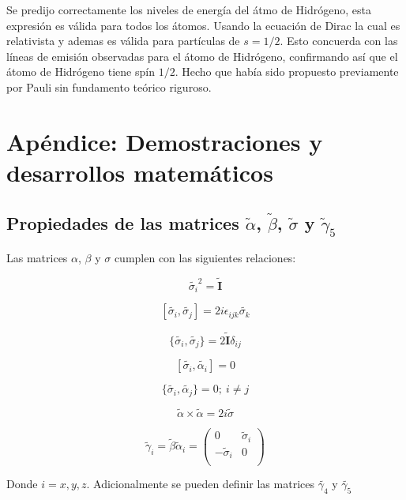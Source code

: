 \documentclass[a4paper, 12pt]{article} %
\begin{document}
Se predijo correctamente los niveles de energ\'ia del \'atmo de Hidr\'ogeno,
esta expresi\'on es v\'alida para todos los \'atomos. Usando la ecuaci\'on 
de Dirac la cual es relativista y ademas es v\'alida para part\'iculas 
de $s=1/2$. Esto concuerda con las l\'ineas de emisi\'on observadas para 
el \'atomo de Hidr\'ogeno, confirmando as\'i  que el \'atomo de Hidr\'ogeno 
tiene sp\'in $1/2$. Hecho que hab\'ia sido propuesto previamente por Pauli
sin fundamento te\'orico riguroso.




\section{Ap\'endice: Demostraciones y desarrollos matem\'aticos}\label{sec:apendice}

\subsection{Propiedades de las matrices $\widetilde{\alpha}$, $\widetilde{\beta}$,  
$\widetilde{\sigma}$ y $\widetilde{\gamma}_5$}\label{sec:gamma5}

Las matrices $\alpha$, $\beta$ y $\sigma$ cumplen con las siguientes relaciones:

\[
\widetilde{\sigma_i}^2 = \widetilde{\mathbf{I}}
\]

\[
[\widetilde{\sigma_i}, \widetilde{\sigma_j}] = 2i\epsilon_{ijk}\widetilde{\sigma_k}
\]

\[
\{\widetilde{\sigma_i},\widetilde{\sigma_j}\} = 2\widetilde{\mathbf{I}}\delta_{ij}
\]

\[
[\widetilde{\sigma_i}, \widetilde{\alpha_i}] = 0
\]

\[
\{ \widetilde{\sigma_i}, \widetilde{\alpha_j} \} = 0;  \ i \neq j
\]

\[
\widetilde{\alpha} \times \widetilde{\alpha} = 2i\widetilde{\sigma}
\]

\[
\widetilde{\gamma}_i = \widetilde{\beta}\widetilde{\alpha}_i = 
\begin{pmatrix}
0 & \widetilde{\sigma}_i \\
-\widetilde{\sigma}_i & 0 \\
\end{pmatrix}
\]

Donde $i = x, y, z$. Adicionalmente se pueden definir las matrices $\widetilde{\gamma_4}$ y $\widetilde{\gamma_5}$
\end{document}
